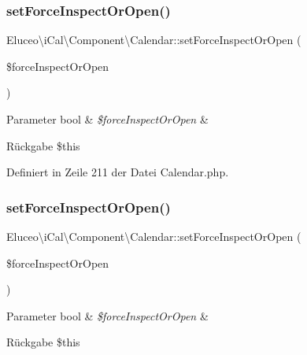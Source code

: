 \subsubsection{\texorpdfstring{set\+Force\+Inspect\+Or\+Open()}{setForceInspectOrOpen()}\hspace{0.1cm}{\footnotesize\ttfamily [1/3]}}
{\footnotesize\ttfamily Eluceo\textbackslash{}i\+Cal\textbackslash{}\+Component\textbackslash{}\+Calendar\+::set\+Force\+Inspect\+Or\+Open (\begin{DoxyParamCaption}\item[{}]{\$force\+Inspect\+Or\+Open }\end{DoxyParamCaption})}


\begin{DoxyParams}[1]{Parameter}
bool & {\em \$force\+Inspect\+Or\+Open} & \\
\hline
\end{DoxyParams}
\begin{DoxyReturn}{Rückgabe}
\$this 
\end{DoxyReturn}


Definiert in Zeile 211 der Datei Calendar.\+php.

\mbox{\label{class_eluceo_1_1i_cal_1_1_component_1_1_calendar_a623d0cda85b6b5eda9600aa035b6388f}} 
\subsubsection{\texorpdfstring{set\+Force\+Inspect\+Or\+Open()}{setForceInspectOrOpen()}\hspace{0.1cm}{\footnotesize\ttfamily [2/3]}}
{\footnotesize\ttfamily Eluceo\textbackslash{}i\+Cal\textbackslash{}\+Component\textbackslash{}\+Calendar\+::set\+Force\+Inspect\+Or\+Open (\begin{DoxyParamCaption}\item[{}]{\$force\+Inspect\+Or\+Open }\end{DoxyParamCaption})}


\begin{DoxyParams}[1]{Parameter}
bool & {\em \$force\+Inspect\+Or\+Open} & \\
\hline
\end{DoxyParams}
\begin{DoxyReturn}{Rückgabe}
\$this 
\end{DoxyReturn}


